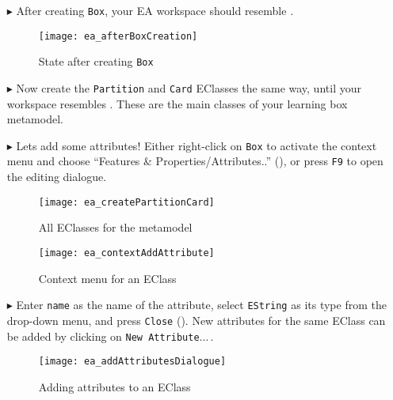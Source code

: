\begin{itemize}
\item[$\blacktriangleright$] After creating \texttt{Box}, your EA workspace should resemble .

\vspace{0.5cm}

\begin{figure}[htbp]
	\centering
  \texttt{[image: ea\_afterBoxCreation]}
	\caption{State after creating \texttt{Box}}
	\label{ea:eclass_completed}
\end{figure}

\item[$\blacktriangleright$] Now create the \texttt{Partition} and \texttt{Card} EClasses the same way, until your workspace resembles
. These are the main classes of your learning box metamodel.

\vspace{0.5cm}

\item[$\blacktriangleright$] Lets add some attributes! Either right-click on \texttt{Box} to activate the context menu and choose ``Features \&
Properties/Attributes..'' (), or press \texttt{F9} to open the editing dialogue.

\begin{figure}[htbp]
	\centering
  \texttt{[image: ea\_createPartitionCard]}
	\caption{All EClasses for the metamodel}
	\label{ea:all_eclasses}
\end{figure}

\begin{figure}[htbp]
	\centering
  \texttt{[image: ea\_contextAddAttribute]}
	\caption{Context menu for an EClass}
	\label{ea:attribute}
\end{figure}
\FloatBarrier

\item[$\blacktriangleright$] Enter \texttt{name} as the name of the attribute, select \texttt{EString} as its type from the drop-down menu, and press
\texttt{Close} (). New attributes for the same EClass can be added by clicking on \texttt{New Attribute}...\,.

\vspace{1.0cm}

\begin{figure}[htbp]
	\centering
  \texttt{[image: ea\_addAttributesDialogue]}
	\caption{Adding attributes to an EClass}
	\label{ea:attribute_properties}
\end{figure}


\end{itemize}
